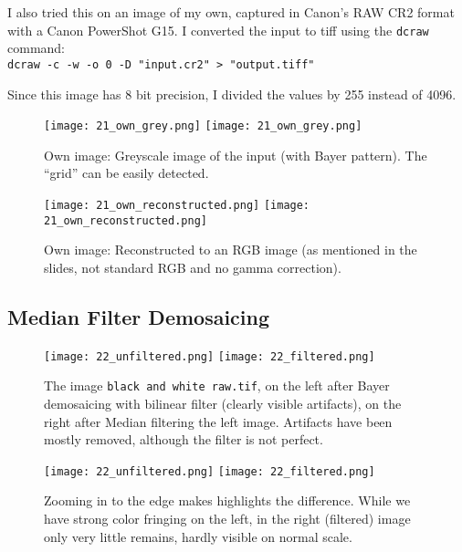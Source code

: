 \documentclass[11pt,a4]{article}
\begin{document}
I also tried this on an image of my own, captured in Canon's RAW CR2 format with a Canon PowerShot G15. I converted the input to tiff using the \texttt{dcraw} command:\\
\texttt{dcraw -c -w -o 0 -D "input.cr2" > "output.tiff"}

Since this image has 8 bit precision, I divided the values by 255 instead of 4096.

\begin{figure}[htb]
    \begin{center}
    	\texttt{[image: 21\_own\_grey.png]}
        \texttt{[image: 21\_own\_grey.png]}
        \caption{Own image: Greyscale image of the input (with Bayer pattern). The ``grid'' can be easily detected.}
    \end{center}
\end{figure}

\begin{figure}[htb]
    \begin{center}
    	\texttt{[image: 21\_own\_reconstructed.png]}
        \texttt{[image: 21\_own\_reconstructed.png]}
        \caption{Own image: Reconstructed to an RGB image (as mentioned in the slides, not standard RGB and no gamma correction).}
    \end{center}
\end{figure}

\newpage
\FloatBarrier
\subsection{Median Filter Demosaicing}

\begin{figure}[htb]
    \begin{center}
    	\texttt{[image: 22\_unfiltered.png]}
        \texttt{[image: 22\_filtered.png]}
        \caption{The image \texttt{black and white raw.tif}, on the left after Bayer demosaicing with bilinear filter (clearly visible artifacts), on the right after Median filtering the left image. Artifacts have been mostly removed, although the filter is not perfect. \label{img:22whole}}
    \end{center}
\end{figure}

\begin{figure}[htb]
    \begin{center}
    	\texttt{[image: 22\_unfiltered.png]}
        \texttt{[image: 22\_filtered.png]}
        \caption{Zooming in to the edge makes highlights the difference. While we have strong color fringing on the left, in the right (filtered) image only very little remains, hardly visible on normal scale. \label{img:22zoom}}
    \end{center}
\end{figure}
\end{document}
